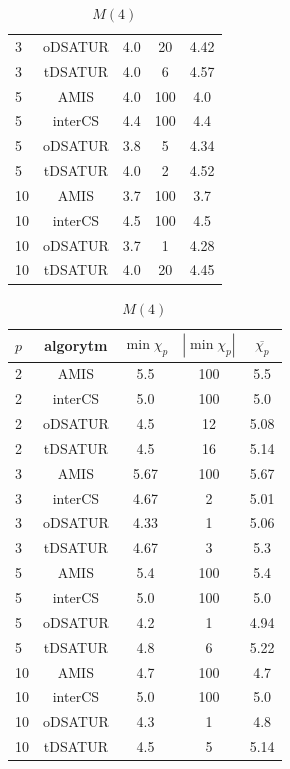 \documentclass[10pt,a4paper]{article}
\begin{document}
\begin{table}[H]
\begin{minipage}{.5\linewidth}
\begin{tabular}{|l|c|c|c|c|}
				3 & oDSATUR & 4.0 & 20 & 4.42 \\
				3 & tDSATUR & 4.0 & 6 & 4.57 \\
				\hline
				5 & AMIS & 4.0 & 100 & 4.0 \\
				5 & interCS & 4.4 & 100 & 4.4 \\
				5 & oDSATUR & 3.8 & 5 & 4.34 \\
				5 & tDSATUR & 4.0 & 2 & 4.52 \\
				\hline
				10 & AMIS & 3.7 & 100 & 3.7 \\
				10 & interCS & 4.5 & 100 & 4.5 \\
				10 & oDSATUR & 3.7 & 1 & 4.28 \\
				10 & tDSATUR & 4.0 & 20 & 4.45 \\
				\hline
			\end{tabular}
			\caption{$M(4)$}
		\end{minipage}
		\begin{minipage}{.5\linewidth}
			\centering
			\begin{tabular}{|l|c|c|c|c|}
				\hline
				\textbf{$p$} & \textbf{algorytm} & \textbf{$\min \chi_{p}$} & \textbf{$|\min \chi_{p}|$} & \textbf{$\overline{\chi_{p}}$} \\
				\hline
				2 & AMIS & 5.5 & 100 & 5.5 \\
				2 & interCS & 5.0 & 100 & 5.0 \\
				2 & oDSATUR & 4.5 & 12 & 5.08 \\
				2 & tDSATUR & 4.5 & 16 & 5.14 \\
				\hline
				3 & AMIS & 5.67 & 100 & 5.67 \\
				3 & interCS & 4.67 & 2 & 5.01 \\
				3 & oDSATUR & 4.33 & 1 & 5.06 \\
				3 & tDSATUR & 4.67 & 3 & 5.3 \\
				\hline
				5 & AMIS & 5.4 & 100 & 5.4 \\
				5 & interCS & 5.0 & 100 & 5.0 \\
				5 & oDSATUR & 4.2 & 1 & 4.94 \\
				5 & tDSATUR & 4.8 & 6 & 5.22 \\
				\hline
				10 & AMIS & 4.7 & 100 & 4.7 \\
				10 & interCS & 5.0 & 100 & 5.0 \\
				10 & oDSATUR & 4.3 & 1 & 4.8 \\
				10 & tDSATUR & 4.5 & 5 & 5.14 \\
				\hline
			\end{tabular}

\end{minipage}
\end{table}
\end{document}
